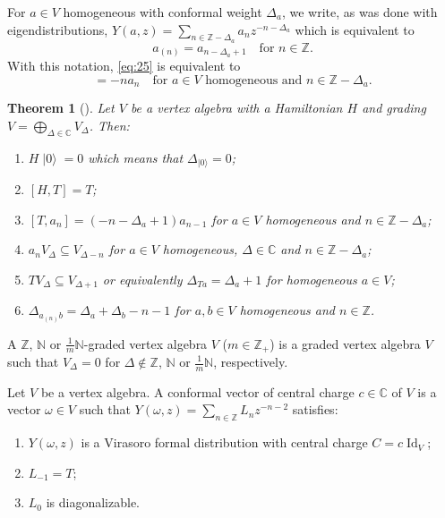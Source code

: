 \documentclass[a4paper, 12pt, reqno]{amsart}
\newtheorem{theorem}{Theorem}[subsection]
\theoremstyle{remark}
\numberwithin{equation}{subsection}
\DeclareMathOperator{\Id}{Id}
\DeclareMathOperator{\vac}{|0\rangle}
\begin{document}
For $a \in V$ homogeneous with conformal weight $\Delta_a$, we write, as was done with eigendistributions, $Y(a,z) = \sum_{n \in \mathbb{Z} - \Delta_a}a_nz^{-n - \Delta_a}$ which is equivalent to
\begin{equation*}
  a_{(n)} = a_{n - \Delta_a + 1} \quad \text{for }n \in \mathbb{Z}.
\end{equation*}
With this notation, \eqref{eq:25} is equivalent to
\begin{equation*}
  [H, a_n] = -na_n \quad \text{for } a \in V\text{ homogeneous and }n \in \mathbb{Z} - \Delta_a.
\end{equation*}

\begin{theorem}[{\cite[\S4.9]{kac_vertex_1998}}]
  \label{thr:16}
  Let $V$ be a vertex algebra with a Hamiltonian $H$ and grading $V = \bigoplus_{\Delta \in \mathbb{C}}V_{\Delta}$.
  Then:
  \begin{enumerate}
  \item $H\vac = 0$ which means that $\Delta_{\vac} = 0$;
  \item $[H, T] = T$;
  \item $[T, a_n] = (-n - \Delta_a + 1)a_{n - 1}$ for $a \in V$ homogeneous and $n \in \mathbb{Z} - \Delta_a$;
  \item $a_nV_{\Delta} \subseteq V_{\Delta - n}$ for $a \in V$ homogeneous, $\Delta \in \mathbb{C}$ and $n \in \mathbb{Z} - \Delta_a$;
  \item $TV_\Delta \subseteq V_{\Delta + 1}$ or equivalently $\Delta_{Ta} = \Delta_a + 1$ for homogeneous $a \in V$;
  \item $\Delta_{a_{(n)}b} = \Delta_a + \Delta_b - n - 1$ for $a, b \in V$ homogeneous and $n \in \mathbb{Z}$.
  \end{enumerate}
\end{theorem}

A $\mathbb{Z}$, $\mathbb{N}$ or $\frac{1}{m}\mathbb{N}$-graded vertex algebra $V$ ($m \in \mathbb{Z}_+$) is a graded vertex algebra $V$ such that $V_{\Delta} = 0$ for $\Delta \notin \mathbb{Z}$, $\mathbb{N}$ or $\frac{1}{m}\mathbb{N}$, respectively.

Let $V$ be a vertex algebra.
A conformal vector of central charge $c \in \mathbb{C}$ of $V$ is a vector $\omega \in V$ such that $Y(\omega, z) = \sum_{n \in \mathbb{Z}}L_nz^{-n - 2}$ satisfies:
\begin{enumerate}
\item $Y(\omega, z)$ is a Virasoro formal distribution with central charge $C = c\Id_V$;
\item $L_{-1} = T$;
\item $L_0$ is diagonalizable. 
\end{enumerate}
\end{document}
